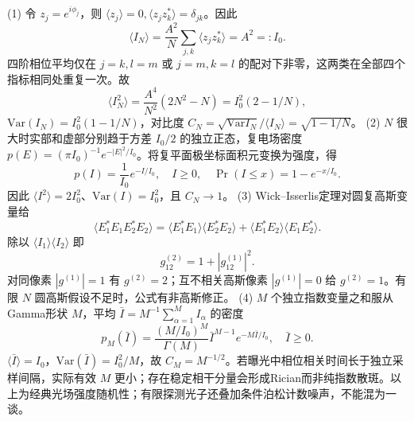 (1) 令 \(z_j=e^{i\phi_j}\)，则 \(\langle z_j\rangle=0,\langle z_jz_k^*\rangle=\delta_{jk}\)。因此
\[
\langle I_N\rangle=\frac{A^2}N\sum_{j,k}\langle z_jz_k^*\rangle=A^2=:I_0.
\]
四阶相位平均仅在 \(j=k,l=m\) 或 \(j=m,k=l\) 的配对下非零，这两类在全部四个指标相同处重复一次。故
\[
\langle I_N^2\rangle=\frac{A^4}{N^2}(2N^2-N)=I_0^2(2-1/N),
\]
\(\mathrm{Var}(I_N)=I_0^2(1-1/N)\)，对比度
\(C_N=\sqrt{\mathrm{Var}I_N}/\langle I_N\rangle=\sqrt{1-1/N}\)。
(2) \(N\) 很大时实部和虚部分别趋于方差 \(I_0/2\) 的独立正态，复电场密度 \(p(E)=(\pi I_0)^{-1}e^{-|E|^2/I_0}\)。将复平面极坐标面积元变换为强度，得
\[
p(I)=\frac1{I_0}e^{-I/I_0},\quad I\ge0,\quad
\Pr(I\le x)=1-e^{-x/I_0}.
\]
因此 \(\langle I^2\rangle=2I_0^2\)、\(\mathrm{Var}(I)=I_0^2\)，且 \(C_N\to1\)。
(3) Wick--Isserlis定理对圆复高斯变量给
\[
\langle E_1^*E_1E_2^*E_2\rangle
=\langle E_1^*E_1\rangle\langle E_2^*E_2\rangle
+\langle E_1^*E_2\rangle\langle E_1E_2^*\rangle.
\]
除以 \(\langle I_1\rangle\langle I_2\rangle\) 即
\[
g^{(2)}_{12}=1+|g^{(1)}_{12}|^2.
\]
对同像素 \(|g^{(1)}|=1\) 有 \(g^{(2)}=2\)；互不相关高斯像素 \(|g^{(1)}|=0\) 给 \(g^{(2)}=1\)。有限 \(N\) 圆高斯假设不足时，公式有非高斯修正。
(4) \(M\) 个独立指数变量之和服从Gamma形状 \(M\)，平均 \(\bar I=M^{-1}\sum_{\alpha=1}^M I_\alpha\) 的密度
\[
p_M(\bar I)=\frac{(M/I_0)^M}{\Gamma(M)}\bar I^{M-1}e^{-M\bar I/I_0},\quad\bar I\ge0.
\]
\(\langle\bar I\rangle=I_0\)，\(\mathrm{Var}(\bar I)=I_0^2/M\)，故 \(C_M=M^{-1/2}\)。若曝光中相位相关时间长于独立采样间隔，实际有效 \(M\) 更小；存在稳定相干分量会形成Rician而非纯指数散斑。以上为经典光场强度随机性；有限探测光子还叠加条件泊松计数噪声，不能混为一谈。
